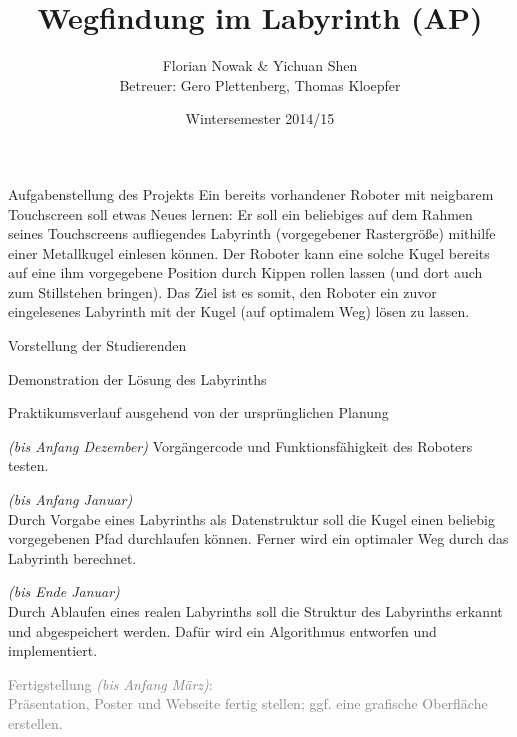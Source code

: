 \documentclass{beamer}
\title{Wegfindung im Labyrinth (AP)}
\author{\texorpdfstring{Florian Nowak \& Yichuan Shen\\ Betreuer: Gero Plettenberg, Thomas Kloepfer}{Florian Nowak \& Yichuan Shen}}
\date{Wintersemester 2014/15}
\begin{document}
\maketitle

\begin{frame}[fragile,t]{Aufgabenstellung des Projekts}
Ein bereits vorhandener Roboter mit neigbarem Touchscreen soll etwas Neues lernen: Er soll ein beliebiges auf dem Rahmen seines Touchscreens aufliegendes Labyrinth (vorgegebener Rastergröße) mithilfe einer Metallkugel einlesen können. Der Roboter kann eine solche Kugel bereits auf eine ihm vorgegebene Position durch Kippen rollen lassen (und dort auch zum Stillstehen bringen). Das Ziel ist es somit, den Roboter ein zuvor eingelesenes Labyrinth mit der Kugel (auf optimalem Weg) lösen zu lassen.

\medskip\noindent
{}
\end{frame}

\begin{frame}[fragile,t]{Vorstellung der Studierenden}
\end{frame}

\begin{frame}[fragile,t]{Demonstration der Lösung des Labyrinths}
\end{frame}

\begin{frame}[fragile,t]{Praktikumsverlauf ausgehend von der ursprünglichen Planung}
\begin{enumerate}
 \item {} \textit{(bis Anfang Dezember)}\blue{:} Vorgängercode und Funktionsfähigkeit des Roboters testen.
 \item {} \textit{(bis Anfang Januar)}\blue{:}\\
 Durch Vorgabe eines Labyrinths als Datenstruktur soll die Kugel einen beliebig vorgegebenen Pfad durchlaufen können. Ferner wird ein optimaler Weg durch das Labyrinth berechnet.
 \item {} \textit{(bis Ende Januar)}\blue{:}\\
 Durch Ablaufen eines realen Labyrinths soll die Struktur des Labyrinths erkannt und abgespeichert werden. Dafür wird ein Algorithmus entworfen und implementiert.
 \textcolor{gray}{
 \item[\textcolor{gray}{4.}] Fertigstellung \textit{(bis Anfang März)}:\\
Präsentation, Poster und Webseite fertig stellen; ggf. eine grafische Oberfläche erstellen.
}
\end{enumerate}
\end{frame}
\end{document}

